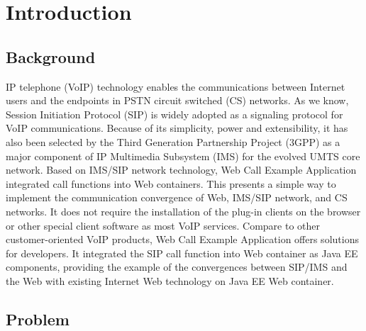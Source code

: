\chapter{Introduction}
\label{sec:Introduction}


\section{Background}
\label{sec:Introduction:Background}

IP telephone (VoIP) technology enables the communications between Internet users and the endpoints in PSTN circuit switched (CS) networks.  As we know, Session Initiation Protocol (SIP) is widely adopted as a signaling protocol for VoIP communications.  Because of its simplicity, power and extensibility, it has also been selected by the Third Generation Partnership Project (3GPP) as a major component of IP Multimedia Subsystem (IMS) for the evolved UMTS core network. 
Based on IMS/SIP network technology, Web Call Example Application integrated call functions into Web containers. This presents a simple way to implement the communication convergence of Web, IMS/SIP network, and CS networks. It does not require the installation of the plug-in clients on the browser or other special client software as most VoIP services.
Compare to other customer-oriented VoIP products, Web Call Example Application offers solutions for developers. It integrated the SIP call function into Web container as Java EE components, providing the example of the convergences between SIP/IMS and the Web with existing Internet Web technology on Java EE Web container.


\section{Problem}
\label{sec:Introduction:Problem}




